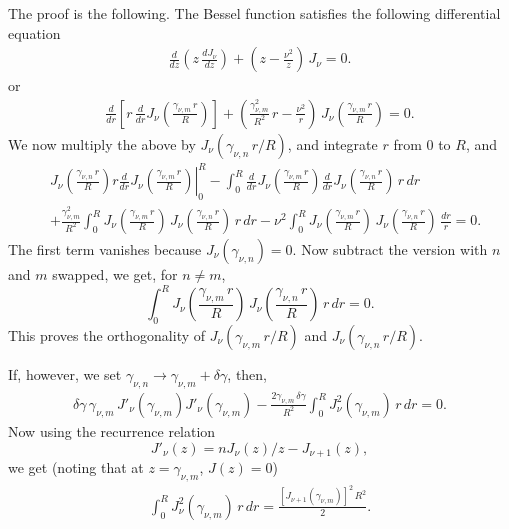 \documentclass[preprint]{revtex4-1}
\numberwithin{equation}{subsection}
\numberwithin{table}{section}
\begin{document}
The proof is the following.
The Bessel function satisfies the following differential equation
\begin{align*}
  \frac{d}{dz} \left( z \, \frac {d J_\nu}{dz} \right)
  + \left(z - \frac{ \nu^2 } { z } \right) \, J_\nu = 0.
\end{align*}
or
\begin{align*}
  \frac{d}{dr} \left[ r \,
    \frac {d}{dr} J_\nu\left( \frac{ \gamma_{\nu, m} \, r } { R } \right)
  \right]
  + \left(
      \frac{\gamma^2_{\nu, m}}{R^2} \,r - \frac{ \nu^2 } { r }
    \right) \, J_\nu\left( \frac{ \gamma_{\nu, m} \, r } { R } \right) = 0.
\end{align*}
%
We now multiply the above by $J_\nu\left( \gamma_{\nu, n} \, r / R \right)$,
and integrate $r$ from $0$ to $R$, and
\begin{align*}
&
  \left.
 J_\nu\left( \frac{ \gamma_{\nu, n} \, r } { R } \right)
  r \frac {d}{dr}
    J_\nu\left( \frac{ \gamma_{\nu, m} \, r } { R } \right)
\right|_0^{R}
-
  \int_0^R
    \frac {d}{dr} J_\nu\left( \frac{ \gamma_{\nu, m} \, r } { R } \right)
    \frac {d}{dr} J_\nu\left( \frac{ \gamma_{\nu, n} \, r } { R } \right)
  \, r \, dr
\\
&+
\frac{\gamma^2_{\nu, m}}{R^2} \int_0^R
J_\nu\left( \frac{ \gamma_{\nu, m} \, r } { R } \right) \,
J_\nu\left( \frac{ \gamma_{\nu, n} \, r } { R } \right) \, r \, dr
-
\nu^2 \int_0^R
J_\nu\left( \frac{ \gamma_{\nu, m} \, r } { R } \right) \,
J_\nu\left( \frac{ \gamma_{\nu, n} \, r } { R } \right) \, \frac{ dr } { r }
= 0.
\end{align*}
The first term vanishes because $J_\nu\left( \gamma_{\nu, n} \right) = 0$.
%
Now subtract the version with $n$ and $m$ swapped,
we get, for $n \ne m$,
\[\int_0^R
J_\nu\left( \frac{ \gamma_{\nu, m} \, r } { R } \right) \,
J_\nu\left( \frac{ \gamma_{\nu, n} \, r } { R } \right) \, r \, dr
= 0.
\]
This proves the orthogonality of
$J_\nu\left( \gamma_{\nu, m} \, r / R \right)$
and
$J_\nu\left( \gamma_{\nu, n} \, r / R \right)$.

If, however, we set $\gamma_{\nu, n} \rightarrow \gamma_{\nu, m} + \delta\gamma$,
then,
\begin{align*}
  \delta \gamma \,
  \gamma_{\nu, m} \,
  J'_\nu( \gamma_{\nu, m} )
  J'_\nu( \gamma_{\nu, m} )
-
  \frac{ 2 \gamma_{\nu, m} \, \delta \gamma }{R^2} \int_0^R
  J^2_\nu( \gamma_{\nu, m} ) \, r \, dr
= 0.
\end{align*}
Now using the recurrence relation
\[
  J'_{\nu}(z) = n J_\nu(z) / z - J_{\nu + 1}(z),
\]
we get (noting that at $z = \gamma_{\nu, m}$, $J(z) = 0$)
\begin{align*}
  \int_0^R
  J^2_\nu( \gamma_{\nu, m} ) \, r \, dr
=
  \frac{
    \left[ J_{\nu+1}( \gamma_{\nu, m} ) \right]^2 \, R^2
  } { 2 }.
\end{align*}
\end{document}
